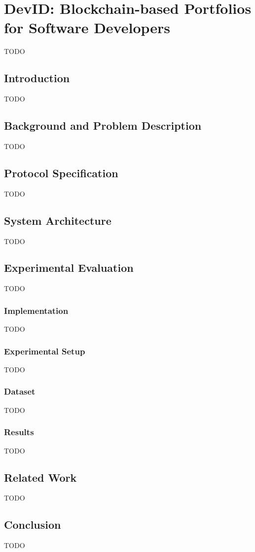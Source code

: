 \chapter{DevID: Blockchain-based Portfolios for Software Developers}
\label{chapter7}

TODO

\section{Introduction}
TODO

\section{Background and Problem Description}
TODO

\section{Protocol Specification}
TODO

\section{System Architecture}
TODO

\section{Experimental Evaluation}
TODO

\subsection{Implementation}
TODO

\subsection{Experimental Setup}
TODO

\subsection{Dataset}
TODO

\subsection{Results}
TODO

\section{Related Work}
TODO

\section{Conclusion}
TODO

\newpage



